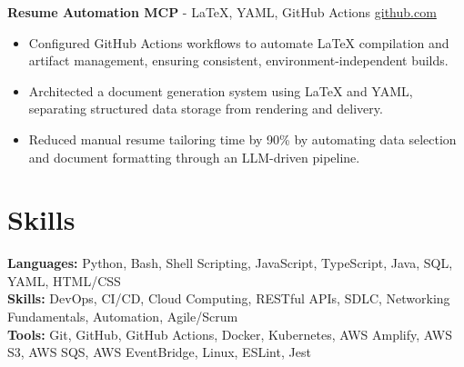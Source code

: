 \documentclass[11pt]{article}       %
\begin{document}
\textbf{Resume Automation MCP}{ - LaTeX, YAML, GitHub Actions} \hfill \href{https://github.com/Monica20030707/Tex_OrangeLeaf-mcp}{github.com} \\
\vspace{-9pt}
\begin{itemize}
  \item Configured GitHub Actions workflows to automate LaTeX compilation and artifact management, ensuring consistent, environment-independent builds.
  \item Architected a document generation system using LaTeX and YAML, separating structured data storage from rendering and delivery.
  \item Reduced manual resume tailoring time by 90\% by automating data selection and document formatting through an LLM-driven pipeline.
\end{itemize}

\vspace{-18.5pt}


\section*{Skills}
\textbf{Languages:} Python, Bash, Shell Scripting, JavaScript, TypeScript, Java, SQL, YAML, HTML/CSS\\
\textbf{Skills:} DevOps, CI/CD, Cloud Computing, RESTful APIs, SDLC, Networking Fundamentals, Automation, Agile/Scrum\\
\textbf{Tools:} Git, GitHub, GitHub Actions, Docker, Kubernetes, AWS Amplify, AWS S3, AWS SQS, AWS EventBridge, Linux, ESLint, Jest\\

\vspace{-6.5pt}
\end{document}
